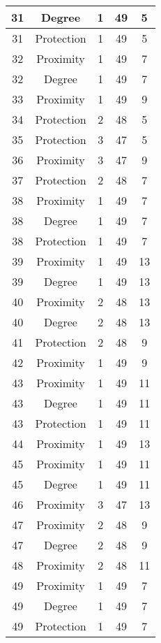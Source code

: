 \documentclass[results.tex]{subfiles}
\begin{document}
\begin{center}
\begin{tabular}{| c || c | c | c | c |}
    \hline
    31 & Degree & 1 & 49 & 5 \\ 
    \hline
    31 & Protection & 1 & 49 & 5 \\ 
    \hline
    32 & Proximity & 1 & 49 & 7 \\ 
    \hline
    32 & Degree & 1 & 49 & 7 \\ 
    \hline
    33 & Proximity & 1 & 49 & 9 \\ 
    \hline
    34 & Protection & 2 & 48 & 5 \\ 
    \hline
    35 & Protection & 3 & 47 & 5 \\ 
    \hline
    36 & Proximity & 3 & 47 & 9 \\ 
    \hline
    37 & Protection & 2 & 48 & 7 \\ 
    \hline
    38 & Proximity & 1 & 49 & 7 \\ 
    \hline
    38 & Degree & 1 & 49 & 7 \\ 
    \hline
    38 & Protection & 1 & 49 & 7 \\ 
    \hline
    39 & Proximity & 1 & 49 & 13 \\ 
    \hline
    39 & Degree & 1 & 49 & 13 \\ 
    \hline
    40 & Proximity & 2 & 48 & 13 \\ 
    \hline
    40 & Degree & 2 & 48 & 13 \\ 
    \hline
    41 & Protection & 2 & 48 & 9 \\ 
    \hline
    42 & Proximity & 1 & 49 & 9 \\ 
    \hline
    43 & Proximity & 1 & 49 & 11 \\ 
    \hline
    43 & Degree & 1 & 49 & 11 \\ 
    \hline
    43 & Protection & 1 & 49 & 11 \\ 
    \hline
    44 & Proximity & 1 & 49 & 13 \\ 
    \hline
    45 & Proximity & 1 & 49 & 11 \\ 
    \hline
    45 & Degree & 1 & 49 & 11 \\ 
    \hline
    46 & Proximity & 3 & 47 & 13 \\ 
    \hline
    47 & Proximity & 2 & 48 & 9 \\ 
    \hline
    47 & Degree & 2 & 48 & 9 \\ 
    \hline
    48 & Proximity & 2 & 48 & 11 \\ 
    \hline
    49 & Proximity & 1 & 49 & 7 \\ 
    \hline
    49 & Degree & 1 & 49 & 7 \\ 
    \hline
    49 & Protection & 1 & 49 & 7 \\ 
    \hline   \end{tabular}
\end{center}
\end{document}
